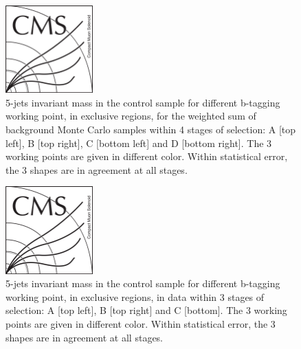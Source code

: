 \begin{figure}[!Hhtbp]
  \begin{center}
    \includegraphics[width=0.3\textwidth]{figs/CMSlogo.png}
    \caption{5-jets invariant mass in the control sample for different b-tagging working point, in exclusive regions, for the weighted sum of background Monte Carlo samples within 4 stages of selection: A [top left], B [top right], C [bottom left] and D [bottom right]. The 3 working points are given in different color. Within statistical error, the 3 shapes are in agreement at all stages.}
    \label{fig:StageExWPSum}
  \end{center}
\end{figure}\clearpage

\begin{figure}[!Hhtbp]
  \begin{center}
    \includegraphics[width=0.3\textwidth]{figs/CMSlogo.png}
    \caption{5-jets invariant mass in the control sample for different b-tagging working point, in exclusive regions, in data within 3 stages of selection: A [top left], B [top right] and C [bottom]. The 3 working points are given in different color. Within statistical error, the 3 shapes are in agreement at all stages.}
    \label{fig:StageExWPData}
  \end{center}
\end{figure}\clearpage

